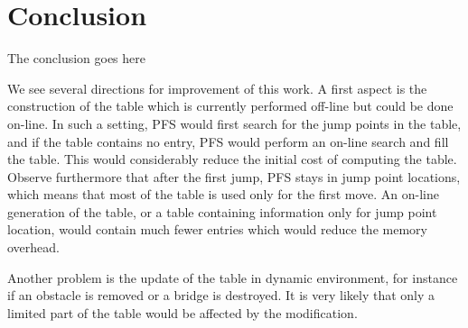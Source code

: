 \section{Conclusion}
The conclusion goes here

We see several directions for improvement of this work.  
A first aspect is the construction of the table 
which is currently performed off-line but could be done on-line.  
In such a setting, PFS would first search for the jump points 
in the table, and if the table contains no entry, 
PFS would perform an on-line search and fill the table.  
This would considerably reduce the initial cost 
of computing the table.  
Observe furthermore that after the first jump, 
PFS stays in jump point locations, 
which means that most of the table 
is used only for the first move.  
An on-line generation of the table, 
or a table containing information only for jump point location, 
would contain much fewer entries 
which would reduce the memory overhead.  

Another problem is the update of the table 
in dynamic environment, 
for instance if an obstacle is removed 
or a bridge is destroyed.  
It is very likely that only a limited part of the table 
would be affected by the modification.  

